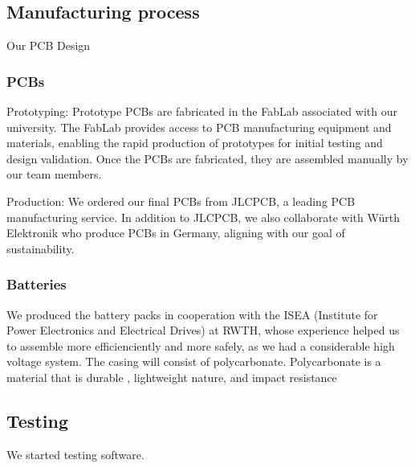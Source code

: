 \subsection{Manufacturing process}
Our PCB Design
\subsubsection{PCBs}
\par Prototyping: Prototype PCBs are fabricated in the FabLab associated with our university. The FabLab provides access to PCB manufacturing equipment and materials, enabling the rapid production of prototypes for initial testing and design validation.
    Once the PCBs are fabricated, they are assembled manually by our team members. 
\par Production: We ordered our final PCBs from JLCPCB, a leading PCB manufacturing service. In addition to JLCPCB, we also collaborate with Würth Elektronik who produce 
PCBs in Germany, aligning with our goal of sustainability.
\subsubsection{Batteries}
We produced the battery packs in cooperation with the ISEA (Institute for Power Electronics and Electrical Drives) at RWTH, whose experience helped us to assemble
more efficienciently and more safely, as we had a considerable high voltage system.
The casing will consist of polycarbonate. Polycarbonate is a material that is
durable , lightweight nature, and impact resistance

\subsection{Testing}
We started testing software.

